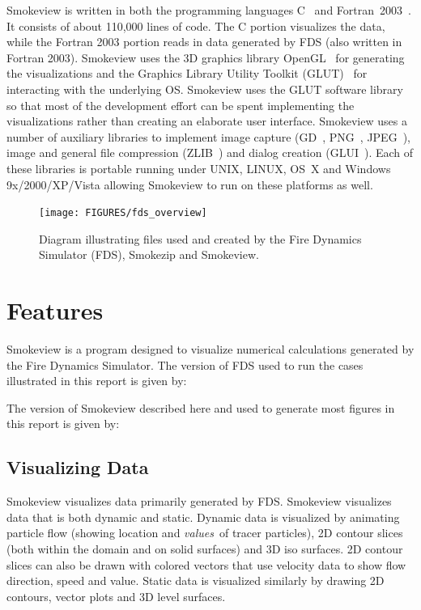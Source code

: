 \documentclass[11pt,twoside]{book}
\begin{document}
Smokeview is written in both the programming languages C~\cite{C:book} and
Fortran~2003~\cite{Fortran:book}.  It consists of about 110,000
lines of code. The C portion visualizes the data, while the
Fortran 2003 portion reads in data generated by FDS (also written
in Fortran 2003). Smokeview uses the 3D graphics library
OpenGL~\cite{OpenGLRed} for generating the visualizations and the
Graphics Library Utility Toolkit (GLUT)~\cite{OpenGLGlut} for
interacting with the underlying OS. Smokeview uses the GLUT
software library so that most of the development effort can be
spent implementing the visualizations rather than creating an
elaborate user interface. Smokeview uses a number of auxiliary
libraries to implement image capture (GD~\cite{BOUTELL,GDLIB},
PNG~\cite{PNGLIB}, JPEG~\cite{JPEGLIB}), image and general file
compression (ZLIB~\cite{ZLIB}) and dialog creation
(GLUI~\cite{GLUILIB}). Each of these libraries is portable running
under UNIX, LINUX, OS~X and Windows 9x/2000/XP/Vista allowing
Smokeview to run on these platforms as well.
\begin{figure}[\figoptions]
\centerline{
\texttt{[image: FIGURES/fds\_overview]}}
 \caption[FDS file overview]{Diagram illustrating files used and created by the Fire Dynamics
 Simulator (FDS), Smokezip and Smokeview.}
\label{figfdsoverview}%
\end{figure}

\section{Features}

Smokeview is a program designed to visualize numerical
calculations generated by the Fire Dynamics Simulator.
The version of FDS used to run the cases illustrated  in this report
is given by:

The version of Smokeview described here and used
to generate most figures in this report is given by:


\subsection{Visualizing Data}

Smokeview visualizes data primarily generated by FDS.
Smokeview visualizes data that is both dynamic and static.  Dynamic
data is visualized by animating particle flow (showing
location and {\em values}\ of tracer particles), 2D contour
slices (both within the domain and on solid surfaces) and
3D iso surfaces.  2D contour slices can also be drawn
with colored vectors that use velocity data to show flow
direction, speed and value. Static data is visualized
similarly by drawing 2D contours, vector plots and 3D level
surfaces.
\end{document}
